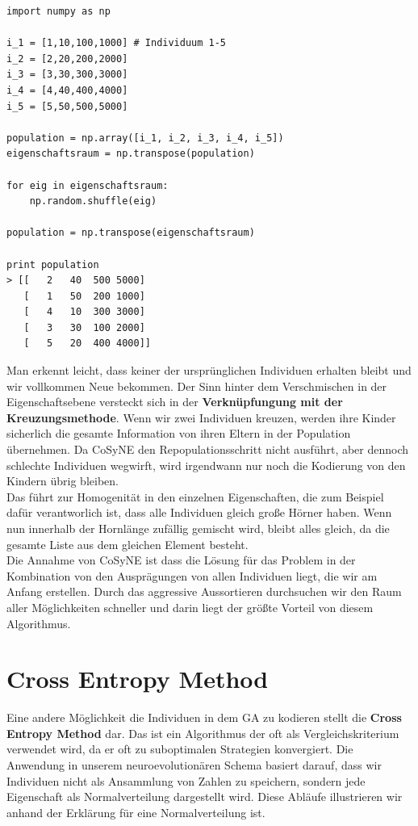             \begin{mdframed}
            \begin{verbatim}
import numpy as np

i_1 = [1,10,100,1000] # Individuum 1-5
i_2 = [2,20,200,2000]
i_3 = [3,30,300,3000]
i_4 = [4,40,400,4000]
i_5 = [5,50,500,5000]

population = np.array([i_1, i_2, i_3, i_4, i_5])
eigenschaftsraum = np.transpose(population)
  
for eig in eigenschaftsraum:
    np.random.shuffle(eig)

population = np.transpose(eigenschaftsraum)

print population
> [[   2   40  500 5000]
   [   1   50  200 1000]
   [   4   10  300 3000]
   [   3   30  100 2000]
   [   5   20  400 4000]]

            \end{verbatim}
            \end{mdframed}
            \noindent
            Man erkennt leicht, dass keiner der ursprünglichen Individuen erhalten bleibt und wir vollkommen Neue bekommen. Der Sinn hinter dem Verschmischen in der Eigenschaftsebene versteckt sich in der \textbf{Verknüpfungung mit der Kreuzungsmethode}. Wenn wir zwei Individuen kreuzen, werden ihre Kinder sicherlich die gesamte Information von ihren Eltern in der Population übernehmen. Da CoSyNE den Repopulationsschritt nicht ausführt, aber dennoch schlechte Individuen wegwirft, wird irgendwann nur noch die Kodierung von den Kindern übrig bleiben.\\

            \noindent
            Das führt zur Homogenität in den einzelnen Eigenschaften, die zum Beispiel dafür verantworlich ist, dass alle Individuen gleich große Hörner haben. Wenn nun innerhalb der Hornlänge zufällig gemischt wird, bleibt alles gleich, da die gesamte Liste aus dem gleichen Element besteht. \\

            \noindent
            Die Annahme von CoSyNE ist dass die Lösung für das Problem in der Kombination von den Ausprägungen von allen Individuen liegt, die wir am Anfang erstellen. Durch das aggressive Aussortieren durchsuchen wir den Raum aller Möglichkeiten schneller und darin liegt der größte Vorteil von diesem Algorithmus.

\newpage
    \section{Cross Entropy Method}
        Eine andere Möglichkeit die Individuen in dem GA zu kodieren stellt die \textbf{Cross Entropy Method} dar. Das ist ein Algorithmus der oft als Vergleichskriterium verwendet wird, da er oft zu suboptimalen Strategien konvergiert\cite{cem}. Die Anwendung in unserem neuroevolutionären Schema basiert darauf, dass wir Individuen nicht als Ansammlung von Zahlen zu speichern, sondern jede Eigenschaft als Normalverteilung dargestellt wird. Diese Abläufe illustrieren wir anhand der Erklärung für eine Normalverteilung ist.

